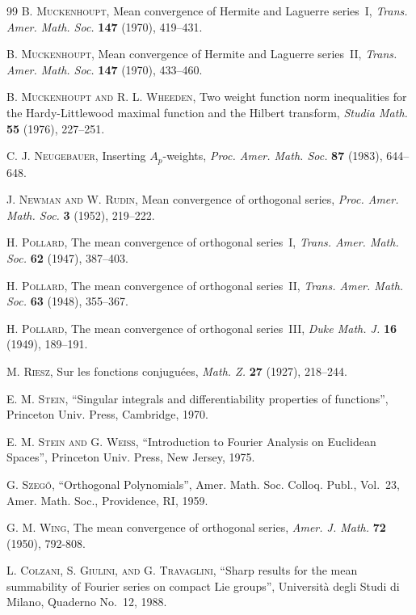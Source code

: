 \documentclass[10pt,a4paper]{article}
\theoremstyle{plain}
\theoremstyle{remark}
\begin{document}
\begin{thebibliography}{99}
\textsc{B. Muckenhoupt}, Mean convergence of Hermite and Laguerre
series~I, \textit{Trans. Amer. Math. Soc.} \textbf{147} (1970), 419--431.

\textsc{B. Muckenhoupt}, Mean convergence of Hermite and Laguerre
series~II, \textit{Trans. Amer. Math. Soc.} \textbf{147} (1970), 433--460.

\textsc{B. Muckenhoupt and R. L. Wheeden}, Two weight function
norm inequalities for the Hardy-Littlewood maximal function and
the Hilbert transform, \textit{Studia Math.} \textbf{55} (1976), 227--251.

\textsc{C. J. Neugebauer}, Inserting $A_p$-weights, \textit{Proc.
Amer. Math. Soc.} \textbf{87} (1983), 644--648.

\textsc{J. Newman and W. Rudin}, Mean convergence of orthogonal
series, \textit{Proc. Amer. Math. Soc.} \textbf{3} (1952), 219--222.

\textsc{H. Pollard}, The mean convergence of orthogonal series~I,
\textit{Trans. Amer. Math. Soc.} \textbf{62} (1947), 387--403.

\textsc{H. Pollard}, The mean convergence of orthogonal series~II,
\textit{Trans. Amer. Math. Soc.} \textbf{63} (1948), 355--367.

\textsc{H. Pollard}, The mean convergence of orthogonal series~III,
\textit{Duke Math. J.} \textbf{16} (1949), 189--191.

\textsc{M. Riesz}, Sur les fonctions conjugu\'{e}es, \textit{Math. Z.}
\textbf{27} (1927), 218--244.

\textsc{E. M. Stein}, ``Singular integrals and differentiability
properties of functions'', Princeton Univ. Press, Cambridge,
1970.

\textsc{E. M. Stein and G. Weiss}, ``Introduction to
Fourier Analysis on Euclidean Spaces'', Princeton Univ.
Press, New Jersey, 1975.

\textsc{G. Szeg\H{o}}, ``Orthogonal Polynomials'',
Amer. Math. Soc. Colloq. Publ., Vol.~23, Amer. Math. Soc., Providence,
RI, 1959.

\textsc{G. M. Wing}, The mean convergence of orthogonal
series, \textit{Amer. J. Math.} \textbf{72} (1950), 792-808.

\textsc{L. Colzani, S. Giulini, and G. Travaglini}, ``Sharp results
for the mean summability of Fourier series on compact Lie groups'',
Universit\`{a} degli Studi di Milano, Quaderno No.~12, 1988.

\end{thebibliography}
\end{document}
